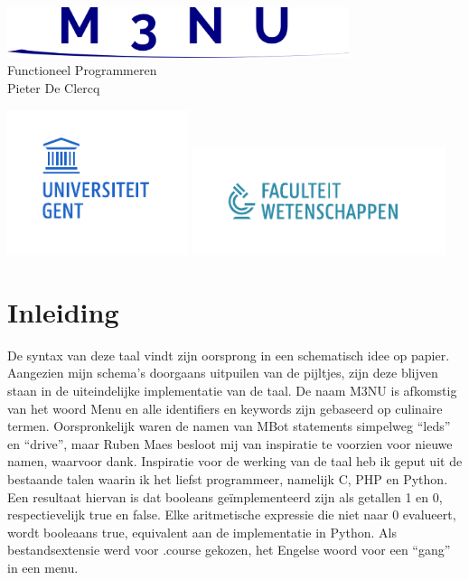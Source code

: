 \documentclass[12pt,a4paper]{report}
\begin{document}

\vspace*{\fill}
\begin{center}
\includegraphics[width=100mm]{verslag/logo.png}
\vspace*{1.5in}\\
  {\Huge Functioneel Programmeren}\\
  {\Large Pieter De Clercq}
\end{center}
\vspace*{\fill}
\begin{center}
\includegraphics[width=53mm]{verslag/logo-ugent.pdf}
\includegraphics[width=74mm]{verslag/logo-we.pdf}
\end{center}
\tableofcontents
\newpage
\chapter{Inleiding}
De syntax van deze taal vindt zijn oorsprong in een schematisch idee op papier. Aangezien mijn schema's doorgaans uitpuilen van de pijltjes, zijn deze blijven staan in de uiteindelijke implementatie van de taal. De naam M3NU is afkomstig van het woord Menu en alle identifiers en keywords zijn gebaseerd op culinaire termen. Oorspronkelijk waren de namen van MBot statements simpelweg ``leds'' en ``drive'', maar Ruben Maes besloot mij van inspiratie te voorzien voor nieuwe namen, waarvoor dank. Inspiratie voor de werking van de taal heb ik geput uit de bestaande talen waarin ik het liefst programmeer, namelijk C, PHP en Python. Een resultaat hiervan is dat booleans geïmplementeerd zijn als getallen 1 en 0, respectievelijk true en false. Elke aritmetische expressie die niet naar 0 evalueert, wordt booleaans true, equivalent aan de implementatie in Python. Als bestandsextensie werd voor .course gekozen, het Engelse woord voor een ``gang'' in een menu.
\end{document}
